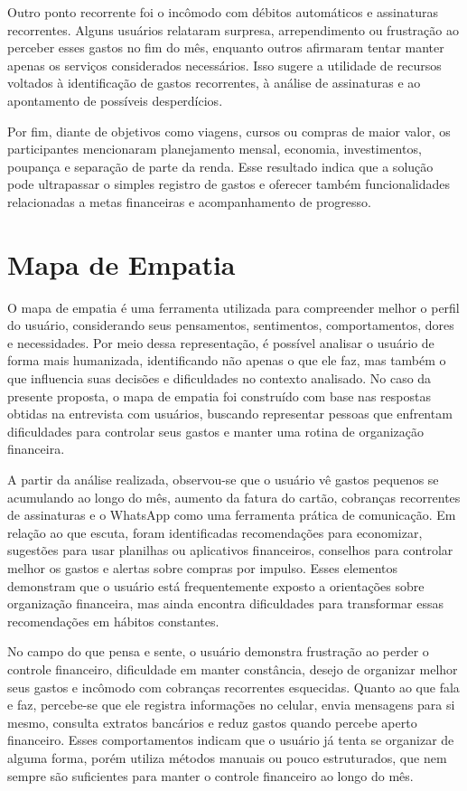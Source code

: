 Outro ponto recorrente foi o incômodo com débitos automáticos e assinaturas recorrentes. Alguns usuários relataram surpresa, arrependimento ou frustração ao perceber esses gastos no fim do mês, enquanto outros afirmaram tentar manter apenas os serviços considerados necessários. Isso sugere a utilidade de recursos voltados à identificação de gastos recorrentes, à análise de assinaturas e ao apontamento de possíveis desperdícios.

Por fim, diante de objetivos como viagens, cursos ou compras de maior valor, os participantes mencionaram planejamento mensal, economia, investimentos, poupança e separação de parte da renda. Esse resultado indica que a solução pode ultrapassar o simples registro de gastos e oferecer também funcionalidades relacionadas a metas financeiras e acompanhamento de progresso.

\section{Mapa de Empatia}

O mapa de empatia é uma ferramenta utilizada para compreender melhor o perfil do usuário, considerando seus pensamentos, sentimentos, comportamentos, dores e necessidades. Por meio dessa representação, é possível analisar o usuário de forma mais humanizada, identificando não apenas o que ele faz, mas também o que influencia suas decisões e dificuldades no contexto analisado. No caso da presente proposta, o mapa de empatia foi construído com base nas respostas obtidas na entrevista com usuários, buscando representar pessoas que enfrentam dificuldades para controlar seus gastos e manter uma rotina de organização financeira.

A partir da análise realizada, observou-se que o usuário vê gastos pequenos se acumulando ao longo do mês, aumento da fatura do cartão, cobranças recorrentes de assinaturas e o WhatsApp como uma ferramenta prática de comunicação. Em relação ao que escuta, foram identificadas recomendações para economizar, sugestões para usar planilhas ou aplicativos financeiros, conselhos para controlar melhor os gastos e alertas sobre compras por impulso. Esses elementos demonstram que o usuário está frequentemente exposto a orientações sobre organização financeira, mas ainda encontra dificuldades para transformar essas recomendações em hábitos constantes.

No campo do que pensa e sente, o usuário demonstra frustração ao perder o controle financeiro, dificuldade em manter constância, desejo de organizar melhor seus gastos e incômodo com cobranças recorrentes esquecidas. Quanto ao que fala e faz, percebe-se que ele registra informações no celular, envia mensagens para si mesmo, consulta extratos bancários e reduz gastos quando percebe aperto financeiro. Esses comportamentos indicam que o usuário já tenta se organizar de alguma forma, porém utiliza métodos manuais ou pouco estruturados, que nem sempre são suficientes para manter o controle financeiro ao longo do mês.

